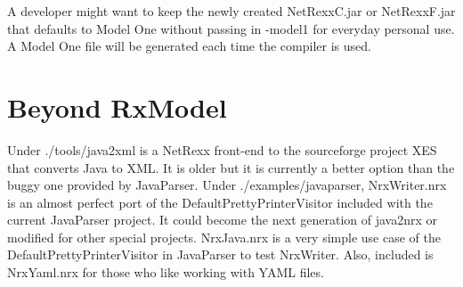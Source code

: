 A developer might want to keep the newly created NetRexxC.jar or NetRexxF.jar that defaults to Model One without passing in -model1 for everyday personal use. A Model One file will be generated each time the compiler is used.

\section{Beyond RxModel}

Under ./tools/java2xml is a NetRexx front-end to the sourceforge project XES that converts Java to XML. It is older but it is currently a better option than the buggy one provided by JavaParser. Under ./examples/javaparser, NrxWriter.nrx is an almost perfect port of the DefaultPrettyPrinterVisitor included with the current JavaParser project. It could become the next generation of java2nrx or modified for other special projects. NrxJava.nrx is a very simple use case of the DefaultPrettyPrinterVisitor in JavaParser to test NrxWriter. Also, included is NrxYaml.nrx for those who like working with YAML files.
